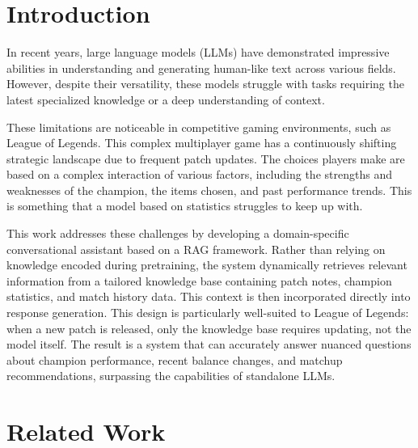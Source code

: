 \documentclass[fleqn,moreauthors,10pt]{ds_report}
\affiliation{\textit{Advisors: Slavko Žitnik}}
\begin{document}
\flushbottom 

\maketitle 

\thispagestyle{empty} 


\section*{Introduction}


	In recent years, large language models (LLMs) have demonstrated impressive abilities in understanding and generating human-like text across various fields. However, despite their versatility, these models struggle with tasks requiring the latest specialized knowledge or a deep understanding of context. 

These limitations are noticeable in competitive gaming environments, such as League of Legends. This complex multiplayer game has a continuously shifting strategic landscape due to frequent patch updates. The choices players make are based on a complex interaction of various factors, including the strengths and weaknesses of the champion, the items chosen, and past performance trends. This is something that a model based on statistics struggles to keep up with.

This work addresses these challenges by developing a domain-specific conversational assistant based on a RAG framework. Rather than relying on knowledge encoded during pretraining, the system dynamically retrieves relevant information from a tailored knowledge base containing patch notes, champion statistics, and match history data. This context is then incorporated directly into response generation. This design is particularly well-suited to League of Legends: when a new patch is released, only the knowledge base requires updating, not the model itself. The result is a system that can accurately answer nuanced questions about champion performance, recent balance changes, and matchup recommendations, surpassing the capabilities of standalone LLMs.

\section*{Related Work}
\end{document}
